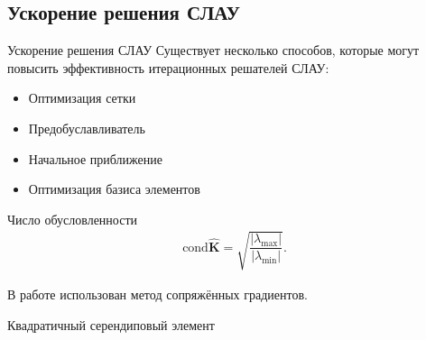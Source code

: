 \subsection{Ускорение решения СЛАУ}
\begin{frame}{Ускорение решения СЛАУ}
	\justifying
	Существует несколько способов, которые могут повысить эффективность итерационных решателей СЛАУ:
	
	\begin{minipage}{0.49\textwidth}
		\begin{itemize}
			\item Оптимизация сетки
			\item Предобуславливатель
			\item Начальное приближение
			\item Оптимизация базиса элементов
		\end{itemize}
		
		Число обусловленности
		\begin{gather*}
			\text{cond} \widehat{\textbf{K}} = \sqrt{\dfrac{|\lambda_{\max}|}{|\lambda_{\min}|}}.
		\end{gather*}
		
		В работе использован метод сопряжённых градиентов.
	\end{minipage}
	\hfill
	\begin{minipage}{0.5\textwidth}
		Квадратичный серендиповый элемент
	\end{minipage}
\end{frame}

